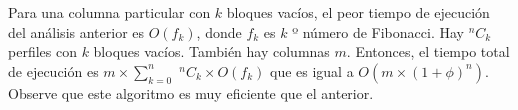 Para una columna particular con \(k\) bloques vacíos, el peor tiempo de ejecución del análisis anterior es \(O(f_{k})\), donde \(f_{k}\) es \(k\) º número de Fibonacci. Hay \(^{n}C_{k}\) perfiles con \(k\) bloques vacíos. También hay columnas \(m\). Entonces, el tiempo total de ejecución es \(m \times \sum_{k = 0}^{n}\) \(^{n}C_{k} \times O(f_{k})\) que es igual a \(O(m \times (1+ \phi)^n)\). Observe que este algoritmo es muy eficiente que el anterior.